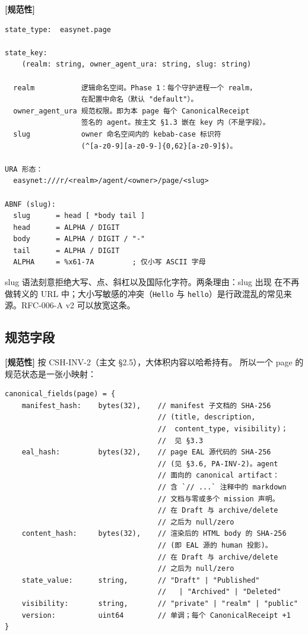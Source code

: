 \documentclass[11pt,a4paper]{article}
\newcommand{\normsv}{\textcolor{normativecolor}{\textbf{[规范性]}}\xspace}
\theoremstyle{definition}
\begin{document}
\normsv{}

\begin{lstlisting}
state_type:  easynet.page

state_key:
    (realm: string, owner_agent_ura: string, slug: string)

  realm           逻辑命名空间。Phase 1：每个守护进程一个 realm，
                  在配置中命名（默认 "default"）。
  owner_agent_ura 规范权限。即为本 page 每个 CanonicalReceipt
                  签名的 agent。按主文 §1.3 嵌在 key 内（不是字段）。
  slug            owner 命名空间内的 kebab-case 标识符
                  (^[a-z0-9][a-z0-9-]{0,62}[a-z0-9]$)。

URA 形态：
  easynet:///r/<realm>/agent/<owner>/page/<slug>

ABNF (slug):
  slug      = head [ *body tail ]
  head      = ALPHA / DIGIT
  body      = ALPHA / DIGIT / "-"
  tail      = ALPHA / DIGIT
  ALPHA     = %x61-7A         ; 仅小写 ASCII 字母
\end{lstlisting}

slug 语法刻意拒绝大写、点、斜杠以及国际化字符。两条理由：slug 出现
在不再做转义的 URL 中；大小写敏感的冲突（\texttt{Hello} 与
\texttt{hello}）是行政混乱的常见来源。RFC-006-A v2 可以放宽这条。

\subsection{规范字段}

\normsv{} 按 CSH-INV-2（主文 \S2.5），大体积内容以哈希持有。
所以一个 page 的规范状态是一张小映射：

\begin{lstlisting}
canonical_fields(page) = {
    manifest_hash:    bytes(32),    // manifest 子文档的 SHA-256
                                    // (title, description,
                                    //  content_type, visibility)；
                                    //  见 §3.3
    eal_hash:         bytes(32),    // page EAL 源代码的 SHA-256
                                    // (见 §3.6, PA-INV-2)。agent
                                    // 面向的 canonical artifact：
                                    // 含 `// ...` 注释中的 markdown
                                    // 文档与零或多个 mission 声明。
                                    // 在 Draft 与 archive/delete
                                    // 之后为 null/zero
    content_hash:     bytes(32),    // 渲染后的 HTML body 的 SHA-256
                                    // (即 EAL 源的 human 投影)。
                                    // 在 Draft 与 archive/delete
                                    // 之后为 null/zero
    state_value:      string,       // "Draft" | "Published"
                                    //   | "Archived" | "Deleted"
    visibility:       string,       // "private" | "realm" | "public"
    version:          uint64        // 单调；每个 CanonicalReceipt +1
}
\end{lstlisting}
\end{document}
